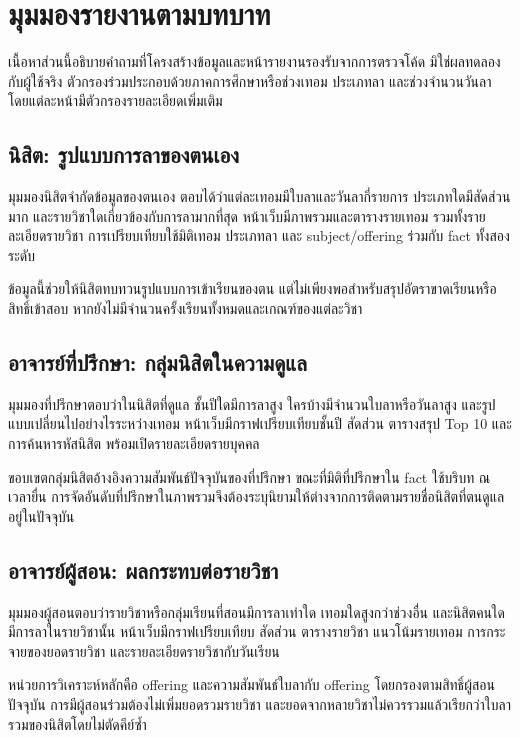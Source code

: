 \section{มุมมองรายงานตามบทบาท}
เนื้อหาส่วนนี้อธิบายคำถามที่โครงสร้างข้อมูลและหน้ารายงานรองรับจากการตรวจโค้ด มิใช่ผลทดลองกับผู้ใช้จริง ตัวกรองร่วมประกอบด้วยภาคการศึกษาหรือช่วงเทอม ประเภทลา และช่วงจำนวนวันลา โดยแต่ละหน้ามีตัวกรองรายละเอียดเพิ่มเติม\cite{pages}

\subsection{นิสิต: รูปแบบการลาของตนเอง}
มุมมองนิสิตจำกัดข้อมูลของตนเอง ตอบได้ว่าแต่ละเทอมมีใบลาและวันลากี่รายการ ประเภทใดมีสัดส่วนมาก และรายวิชาใดเกี่ยวข้องกับการลามากที่สุด หน้าเว็บมีภาพรวมและตารางรายเทอม รวมทั้งรายละเอียดรายวิชา การเปรียบเทียบใช้มิติเทอม ประเภทลา และ subject/offering ร่วมกับ fact ทั้งสองระดับ

ข้อมูลนี้ช่วยให้นิสิตทบทวนรูปแบบการเข้าเรียนของตน แต่ไม่เพียงพอสำหรับสรุปอัตราขาดเรียนหรือสิทธิ์เข้าสอบ หากยังไม่มีจำนวนครั้งเรียนทั้งหมดและเกณฑ์ของแต่ละวิชา

\subsection{อาจารย์ที่ปรึกษา: กลุ่มนิสิตในความดูแล}
มุมมองที่ปรึกษาตอบว่าในนิสิตที่ดูแล ชั้นปีใดมีการลาสูง ใครบ้างมีจำนวนใบลาหรือวันลาสูง และรูปแบบเปลี่ยนไปอย่างไรระหว่างเทอม หน้าเว็บมีกราฟเปรียบเทียบชั้นปี สัดส่วน ตารางสรุป Top 10 และการค้นหารหัสนิสิต พร้อมเปิดรายละเอียดรายบุคคล

ขอบเขตกลุ่มนิสิตอ้างอิงความสัมพันธ์ปัจจุบันของที่ปรึกษา ขณะที่มิติที่ปรึกษาใน fact ใช้บริบท ณ เวลายื่น การจัดอันดับที่ปรึกษาในภาพรวมจึงต้องระบุนิยามให้ต่างจากการติดตามรายชื่อนิสิตที่ตนดูแลอยู่ในปัจจุบัน

\subsection{อาจารย์ผู้สอน: ผลกระทบต่อรายวิชา}
มุมมองผู้สอนตอบว่ารายวิชาหรือกลุ่มเรียนที่สอนมีการลาเท่าใด เทอมใดสูงกว่าช่วงอื่น และนิสิตคนใดมีการลาในรายวิชานั้น หน้าเว็บมีกราฟเปรียบเทียบ สัดส่วน ตารางรายวิชา แนวโน้มรายเทอม การกระจายของยอดรายวิชา และรายละเอียดรายวิชากับวันเรียน

หน่วยการวิเคราะห์หลักคือ offering และความสัมพันธ์ใบลากับ offering โดยกรองตามสิทธิ์ผู้สอนปัจจุบัน การมีผู้สอนร่วมต้องไม่เพิ่มยอดรวมรายวิชา และยอดจากหลายวิชาไม่ควรรวมแล้วเรียกว่าใบลารวมของนิสิตโดยไม่ตัดคีย์ซ้ำ

